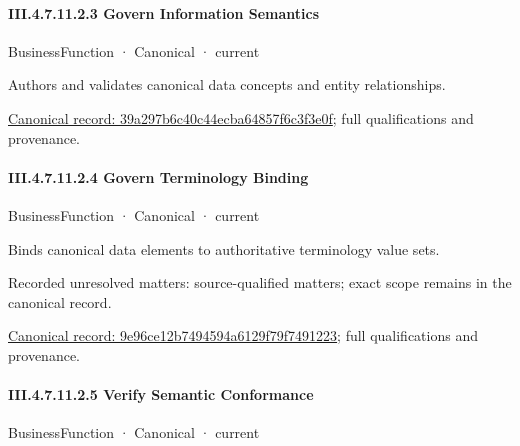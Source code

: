 \paragraph*{III.4.7.11.2.3 Govern Information Semantics}
\label{navigation:III.4.7.11.2.3}

\label{element:39a297b6c40c44ecba64857f6c3f3e0f}
{\small BusinessFunction · Canonical · current}\par

Authors and validates canonical data concepts and entity relationships.


{\footnotesize \href{../../../../../../../continuum/business/business-function/39a297b6c40c44ecba64857f6c3f3e0f.md}{Canonical record: 39a297b6c40c44ecba64857f6c3f3e0f}; full qualifications and provenance.}\par
\paragraph*{III.4.7.11.2.4 Govern Terminology Binding}
\label{navigation:III.4.7.11.2.4}

\label{element:9e96ce12b7494594a6129f79f7491223}
{\small BusinessFunction · Canonical · current}\par

Binds canonical data elements to authoritative terminology value sets.


{\small Recorded unresolved matters: source-qualified matters; exact scope remains in the canonical record.}\par
{\footnotesize \href{../../../../../../../continuum/business/business-function/9e96ce12b7494594a6129f79f7491223.md}{Canonical record: 9e96ce12b7494594a6129f79f7491223}; full qualifications and provenance.}\par
\paragraph*{III.4.7.11.2.5 Verify Semantic Conformance}
\label{navigation:III.4.7.11.2.5}

\label{element:5445184252c94c05874c52350ff13d2b}
{\small BusinessFunction · Canonical · current}\par

